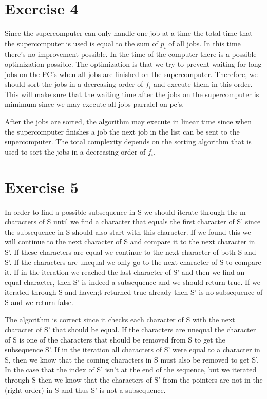 \documentclass{article}
\begin{document}
\section*{Exercise 4}
Since the supercomputer can only handle one job at a time the total time that the supercomputer is used is equal to the sum of $p_i$ of all jobs. In this time there's no improvement possible. In the time of the computer there is a possible optimization possible. The optimization is that we try to prevent waiting for long jobs on the PC's when all jobs are finished on the supercomputer. Therefore, we should sort the jobs in a decreasing order of $f_i$ and execute them in this order. This will make sure that the waiting time after the jobs on the supercomputer is mimimum since we may execute all jobs parralel on pc's.

After the jobs are sorted, the algorithm may execute in linear time since when the supercomputer finishes a job the next job in the list can be sent to the supercomputer. The total complexity depends on the sorting algorithm that is used to sort the jobs in a decreasing order of $f_i$.

\section*{Exercise 5}
In order to find a possible subsequence in S we should iterate through the m characters of S until we find a character that equals the first character of S' since the subsequence in S should also start with this character. If we found this we will continue to the next character of S and compare it to the next character in S'. If these characters are equal we continue to the next character of both S and S'. If the characters are unequal we only go to the next character of S to compare it. If in the iteration we reached the last character of S' and then we find an equal character, then S' is indeed a subsequence and we should return true. If we iterated through S and haven;t returned true already then S' is no subsequence of S and we return false.

The algorithm is correct since it checks each character of S with the next character of S' that should be equal. If the characters are unequal the character of S is one of the characters that should be removed from S to get the subsequence S'. If in the iteration all characters of S' were equal to a character in S, then we know that the coming characters in S must also be removed to get S'. In the case that the index of S' isn't at the end of the sequence, but we iterated through S then we know that the characters of S' from the pointers are not in the (right order) in S and thus S' is not a subsequence.
\end{document}
